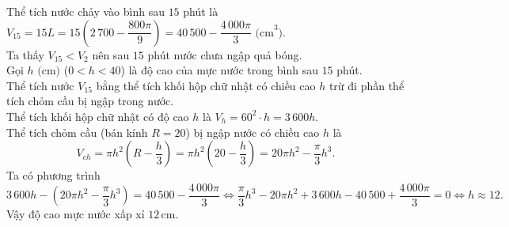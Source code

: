\begin{ex}
{		Thể tích nước chảy vào bình sau $15$ phút là $V_{15} = 15L = 15\left(2\,700 - \dfrac{800\pi}{9}\right) = 40\,500 - \dfrac{4\,000\pi}{3}\text{ (cm}^3\text{)}$.\\
		Ta thấy $V_{15}<V_2$ nên sau $15$ phút nước chưa ngập quả bóng.\\
		Gọi $h\text{ (cm)}$ ($0 < h < 40$) là độ cao của mực nước trong bình sau $15$ phút.\\
		Thể tích nước $V_{15}$ bằng thể tích khối hộp chữ nhật có chiều cao $h$ trừ đi phần thể tích chỏm cầu bị ngập trong nước.\\
		Thể tích khối hộp chữ nhật có độ cao $h$ là $V_h = 60^2 \cdot h = 3\,600h$.\\
		Thể tích chỏm cầu (bán kính $R=20$) bị ngập nước có chiều cao $h$ là
		\[V_{ch} = \pi h^2 \left( R - \dfrac{h}{3} \right) = \pi h^2 \left( 20 - \dfrac{h}{3} \right) = 20\pi h^2 - \dfrac{\pi}{3}h^3.\]
		Ta có phương trình
		\[3\,600h - \left( 20\pi h^2 - \dfrac{\pi}{3}h^3 \right) = 40\,500 - \dfrac{4\,000\pi}{3} \Leftrightarrow \dfrac{\pi}{3}h^3 - 20\pi h^2 + 3\,600h - 40\,500 + \dfrac{4\,000\pi}{3} = 0\Leftrightarrow h\approx 12.\]
		Vậy độ cao mực nước xấp xỉ $12$\,cm.
	}
\end{ex}

